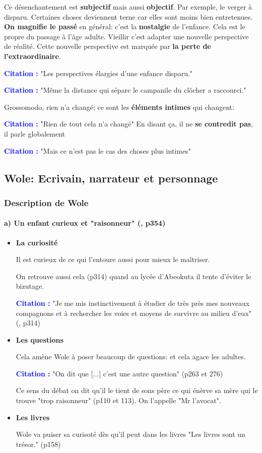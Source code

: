 \documentclass[a4paper, 11pt, hidelinks]{article}
\newcommand{\bs}{\bigskip}
\newcommand{\cit}{\large \textcolor{blue}{\textbf{Citation :}} \large }
\newcommand{\rb}[1]{\Romanbar{#1}}
\begin{document}
\bs

Ce désenchantement est \textbf{subjectif} mais aussi \textbf{objectif}. Par exemple, le verger à disparu. Certaines choses deviennent terne car elles sont
moins bien entretenues. \textbf{On magnifie le passé} en général: c'est la \textbf{nostalgie} de l'enfance. Cela est le propre du passage
à l'âge adulte. Vieillir c'est adapter une nouvelle perspective de réalité. Cette nouvelle perspective est marquée par \textbf{la perte de l'extraordinaire}.

\bs
\cit "Les perspectives élargies d'une enfance disparu."


\cit "Même la distance qui sépare le campanile du clôcher a raccourci."

\bs
Grossomodo, rien n'a changé; ce sont les \textbf{éléments intimes} qui changent:


\cit "Rien de tout cela n'a changé" En disant ça, il ne \textbf{se contredit pas}, il parle globalement


\cit "Mais ce n'est pas le cas des choses plus intimes"







\subsection{Wole: Ecrivain, narrateur et personnage}
\subsubsection{Description de Wole}


\paragraph{a) Un enfant curieux et "raisonneur" (\rb{13}, p354)}


\begin{itemize}
    \item \textbf{La curiosité}
    
    Il est curieux de ce qui l'entoure aussi pour mieux le maîtriser.
    
    On retrouve aussi cela (p314) quand au lycée d'Abeokuta il tente d'éviter le bizutage.

    \cit "Je me mis instinctivement à étudier de très près mes nouveaux compagnons et à rechercher les voies et moyens de survivre au milieu d'eux" (\rb{12}, p314)
    \item \textbf{Les questions}
    
    Cela amène Wole à poser beaucoup de questions: et cela agace les adultes.

    \cit "On dit que [...] c'est une autre question" (p263 et 276)

    Ce sens du débat on dit qu'il le tient de sons père ce qui énèrve sa mère qui le trouve "trop raisonneur" (p110 et 113). On l'appelle "Mr l'avocat".

    \item \textbf{Les livres}
    
    Wole va puiser sa curisoté dès qu'il peut dans les livres "Les livres sont un trésor." (p158)
\end{itemize}
\end{document}
